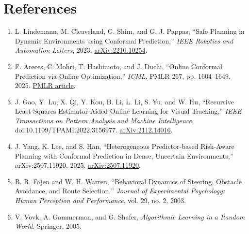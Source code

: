 \documentclass[11pt,a4paper]{article}
\begin{document}
\section{References}
\begin{enumerate}
\item L. Lindemann, M. Cleaveland, G. Shim, and G. J. Pappas, ``Safe Planning in Dynamic Environments using Conformal Prediction,'' \emph{IEEE Robotics and Automation Letters}, 2023. \href{https://arxiv.org/abs/2210.10254}{arXiv:2210.10254}.
\item F. Areces, C. Mohri, T. Hashimoto, and J. Duchi, ``Online Conformal Prediction via Online Optimization,'' \emph{ICML}, PMLR 267, pp. 1604--1649, 2025. \href{https://proceedings.mlr.press/v267/areces25a.html}{PMLR article}.
\item J. Gao, Y. Lu, X. Qi, Y. Kou, B. Li, L. Li, S. Yu, and W. Hu, ``Recursive Least-Squares Estimator-Aided Online Learning for Visual Tracking,'' \emph{IEEE Transactions on Pattern Analysis and Machine Intelligence}, doi:10.1109/TPAMI.2022.3156977. \href{https://arxiv.org/abs/2112.14016}{arXiv:2112.14016}.
\item J. Yang, K. Lee, and S. Han, ``Heterogeneous Predictor-based Risk-Aware Planning with Conformal Prediction in Dense, Uncertain Environments,'' arXiv:2507.11920, 2025. \href{https://arxiv.org/abs/2507.11920}{arXiv:2507.11920}.
\item B. R. Fajen and W. H. Warren, ``Behavioral Dynamics of Steering, Obstacle Avoidance, and Route Selection,'' \emph{Journal of Experimental Psychology: Human Perception and Performance}, vol. 29, no. 2, 2003.
\item V. Vovk, A. Gammerman, and G. Shafer, \emph{Algorithmic Learning in a Random World}. Springer, 2005.
\end{enumerate}
\end{document}
